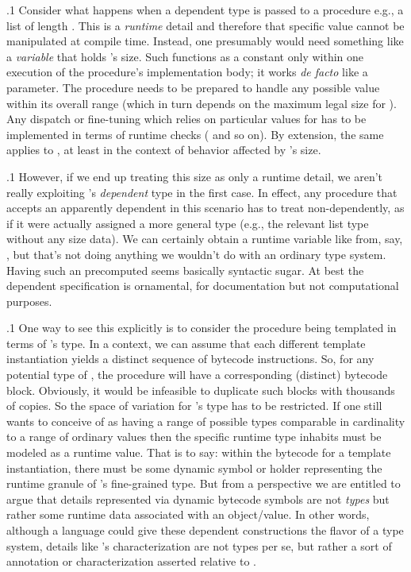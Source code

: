 \documentclass[11pt, twocolumn]{article}
\begin{document}
\p.1{%
Consider what happens when a dependent type
is passed to a procedure \mdash{} e.g., a
list  of length .
This is a \textit{runtime} detail
and therefore that specific value cannot
be manipulated at compile time. Instead,
one presumably would need something like a
\textit{variable} \lLen{} that holds 's size.
Such \lLen{} functions as a constant
only within one execution of the procedure's
implementation body; it works
\textit{de facto} like a parameter.
The procedure needs to be prepared to
handle any possible \lLen{} value
within its overall range (which in turn
depends on the maximum legal size for ).
Any dispatch or fine-tuning which relies on
particular values for \lLen{} has to be
implemented in terms of runtime
checks ( and so on). By extension,
the same applies to , at least
in the context of behavior affected by 's size.
}%

\p.1{%
However, if we end up treating this size as
only a runtime detail, we aren't really
exploiting 's \textit{dependent} type
in the first case. In effect, any procedure
that accepts an apparently dependent
 in this scenario
has to treat  non-dependently, as if
it were actually assigned a more general
type (e.g., the relevant list type without
any size data). We can certainly obtain a
runtime variable like \lLen{} from,
say, , but that's not doing
anything we wouldn't do with an
ordinary type system. Having
such an \lLen{} precomputed seems
basically syntactic sugar. At best the dependent
specification is ornamental, for documentation
but not computational purposes.
}%

\p.1{%
One way to see this explicitly is to consider
the procedure being templated in terms
of 's type. In a  context, we
can assume that each different template
instantiation yields a distinct sequence of bytecode
instructions. So, for any potential type
of , the procedure will have a
corresponding (distinct) bytecode block.
Obviously, it would be infeasible to duplicate
such blocks with thousands of copies.
So the space of variation for 's type
has to be restricted. If one still wants to
conceive of  as having a range of
possible types \mdash{} comparable in cardinality
to a range of ordinary values \mdash{} then the
specific runtime type  inhabits
must be modeled as a runtime value. That is to say: within
the bytecode for a template instantiation,
there must be some dynamic symbol or holder
representing the runtime granule of
's fine-grained type. But from a
 perspective we are entitled to
argue that details represented
via dynamic bytecode symbols are
not \textit{types} but rather some
runtime data associated with an
object/value. In other words, although
a language could give these dependent
constructions the flavor of a type system,
details like 's  characterization
are not types per se, but rather
a sort of annotation or
characterization asserted relative to .
}%
\end{document}
